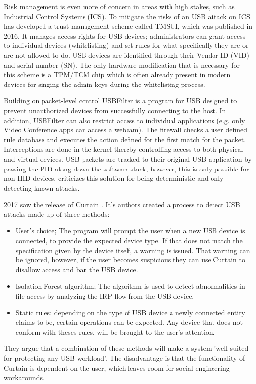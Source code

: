 Risk management is even more of concern in areas with high stakes, such as Industrial Control Systems (ICS). To mitigate the risks of an USB attack on ICS \cite{yangTMSUITrustManagement2016} has developed a trust management scheme called TMSUI, which was published in 2016. It manages access rights for USB devices; administrators can grant access to individual devices (whitelisting) and set rules for what specifically they are or are not allowed to do. USB devices are identified through their Vendor ID (VID) and serial number (SN). The only hardware modification that is necessary for this scheme is a TPM/TCM chip which is often already present in modern devices for singing the admin keys during the whitelisting process.

Building on packet-level control USBFilter \cite{tianMakingUSBGreat2016} is a program for USB designed to prevent unauthorized devices from successfully connecting to the host. In addition, USBFilter can also restrict access to individual applications (e.g. only Video Conference apps can access a webcam). The firewall checks a user defined rule database and executes the action defined for the first match for the packet. Interceptions are done in the kernel thereby controlling access to both physical and virtual devices. USB packets are tracked to their original USB application by passing the PID along down the software stack, however, this is only possible for non-HID devices.
\cite{nissimUSBbasedAttacks2017} criticizes this solution for being deterministic and only detecting known attacks. 

2017 saw the release of Curtain \cite{fuCurtainKeepYour2017}. It's authors created a process to detect USB attacks made up of three methods:
\begin{itemize}
    \item User's choice; The program will prompt the user when a new USB device is connected, to provide the expected device type. If that does not match the specification given by the device itself, a warning is issued. That warning can be ignored, however, if the user becomes suspicious they can use Curtain to disallow access and ban the USB device.
    \item Isolation Forest algorithm; The algorithm is used to detect abnormalities in file access by analyzing the IRP flow from the USB device. 
    \item Static rules: depending on the type of USB device a newly connected entity claims to be, certain operations can be expected. Any device that does not conform with theses rules, will be brought to the user's attention. 
\end{itemize}
They argue that a combination of these methods will make a system 'well-suited for protecting any USB workload'.  The disadvantage is that the functionality of Curtain is dependent on the user, which leaves room for social engineering workarounds.  

